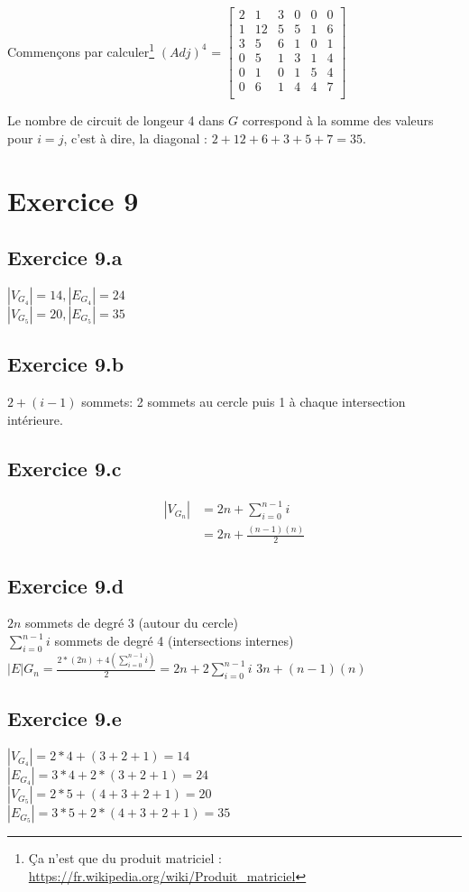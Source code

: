 \documentclass[fontsize=10pt]{article}
\begin{document}
Commençons par calculer\footnote{Ça n'est que du produit matriciel : \url{https://fr.wikipedia.org/wiki/Produit_matriciel}} $(Adj)^4$ = $\begin{bmatrix}
    2 &1 &3 &0 &0 &0 \\
    1 &12&5 &5 &1 &6 \\
    3 &5 &6 &1 &0 &1 \\
    0 &5 &1 &3 &1 &4 \\
    0 &1 &0 &1 &5 &4 \\
    0 &6 &1 &4 &4 &7 \\
\end{bmatrix}$

Le nombre de circuit de longeur 4 dans $G$ correspond à la somme des valeurs
pour $i = j$, c'est à dire, la diagonal : $2 + 12 + 6 + 3 + 5 + 7 = 35$.


\section*{Exercice 9}
\subsection*{Exercice 9.a}
$|V_{G_4}| = 14, |E_{G_4}| = 24$\\
$|V_{G_5}| = 20, |E_{G_5}| = 35$

\subsection*{Exercice 9.b}
$2+(i-1)$ sommets: 2 sommets au cercle puis 1 à chaque intersection intérieure.

\subsection*{Exercice 9.c}
\begin{align*}
    |V_{G_n}| &= 2n + \displaystyle\sum_{i=0}^{n-1} i\\
               &= 2n + \frac{(n-1)(n)}{2}
\end{align*}

\subsection*{Exercice 9.d}
$2n$ sommets de degré 3 (autour du cercle)\\
$\displaystyle\sum_{i=0}^{n-1} i$ sommets de degré 4 (intersections internes)\\

$|E|G_n = \frac{2 * (2n) + 4(\displaystyle\sum_{i=0}^{n-1} i)}{2} =
2n + 2\displaystyle\sum_{i=0}^{n-1} i$ \hspace{1em} $3n + (n-1)(n)$


\subsection*{Exercice 9.e}
$|V_{G_4}| = 2*4+(3+2+1) = 14$\\
$|E_{G_4}| = 3*4+2 * (3+2+1) = 24$\\
$|V_{G_5}| = 2*5+(4+3+2+1) = 20$\\
$|E_{G_5}| = 3*5+2 * (4+3+2+1) = 35$
\end{document}
